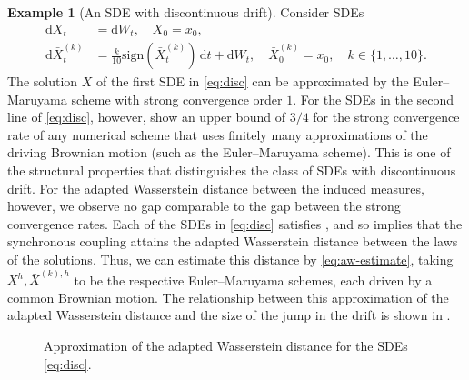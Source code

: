\documentclass[onseside, final]{amsart}
\theoremstyle{definition}
\newtheorem{example}[theorem]{Example}
\newcommand{\sign}{\mathrm{sign}}
\newcommand{\D}{\,\mathrm{d}}
\newcommand{\ds}{\mathrm{d}}
\numberwithin{equation}{section}
\begin{document}
	\begin{example}[An SDE with discontinuous drift]\label{ex:num-disc-drift}
		Consider SDEs
		\begin{equation}\label{eq:disc}
			\begin{split}			
				\ds X_t & = \ds W_t, \quad X_0 = x_0,\\
				\ds \bar X_t^{(k)} &= \frac{k}{10}\sign(\bar X_t^{(k)}) \D t +  \ds W_t, \quad \bar X^{(k)}_0 = x_0, \quad k\in\{1,\dots,10\}.
			\end{split}
		\end{equation}
		The solution $X$ of the first SDE in \eqref{eq:disc} can be approximated by the Euler--Maruyama scheme with strong convergence order $1$. For the SDEs in the second line of \eqref{eq:disc}, however, \citet{MuYa20b,PrScSz23,ElMuYa24} show an upper bound of $3/4$ for the strong convergence rate of any numerical scheme that uses finitely many approximations of the driving Brownian motion (such as the Euler--Maruyama scheme). This is one of the structural properties that distinguishes the class of SDEs with discontinuous drift. For the adapted Wasserstein distance between the induced measures, however, we observe no gap comparable to the gap between the strong convergence rates. Each of the SDEs in \eqref{eq:disc} satisfies , and so  implies that the synchronous coupling attains the adapted Wasserstein distance between the laws of the solutions. Thus, we can estimate this distance by \eqref{eq:aw-estimate}, taking $X^h, \bar X^{(k),h}$ to be the respective Euler--Maruyama schemes, each driven by a common Brownian motion. The relationship between this approximation of the adapted Wasserstein distance and the size of the jump in the drift is shown in .
			\begin{figure}[ht]
				\centering
				
				\caption{Approximation of the adapted Wasserstein distance for the SDEs \eqref{eq:disc}.} 
				\label{fig:disc}
			\end{figure}
	\end{example}
				
\end{document}
